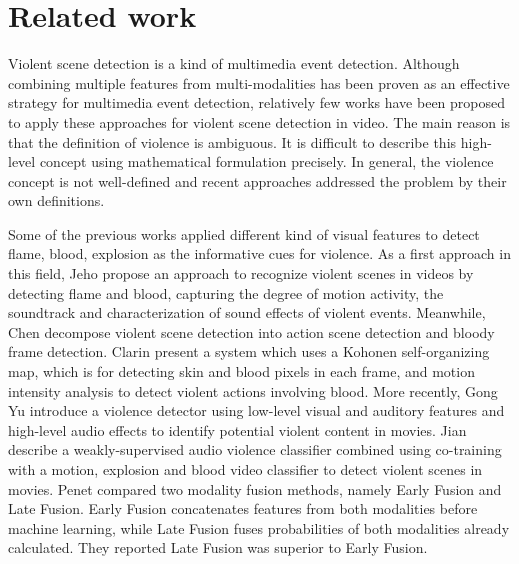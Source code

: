 \documentclass[review]{elsarticle}
\begin{document}
\section{Related work}
Violent scene detection is a kind of multimedia event detection. Although combining multiple features from multi-modalities has been proven as an effective strategy for multimedia event detection, relatively few works have been proposed to apply these approaches for violent scene detection in video. The main reason is that the definition of violence is ambiguous. It is difficult to describe this high-level concept using mathematical formulation precisely. In general, the violence concept is not well-defined and recent approaches addressed the problem by their own definitions.

Some of the previous works applied different kind of visual features to detect flame, blood, explosion as the informative cues for violence. As a first approach in this field, Jeho \cite{nam1998audio} propose an approach to recognize violent scenes in videos by detecting flame and blood, capturing the degree of motion activity, the soundtrack and characterization of sound effects of violent events. Meanwhile, Chen \cite{2} decompose violent scene detection into action scene detection and bloody frame detection. Clarin \cite{3} present a system which uses a Kohonen self-organizing map, which is for detecting skin and blood pixels in each frame, and motion intensity analysis to detect violent actions involving blood. More recently, Gong Yu \cite{11} introduce a violence detector using low-level visual and auditory features and high-level audio effects to identify potential violent content in movies. Jian \cite{17} describe a weakly-supervised audio violence classifier combined using co-training with a motion, explosion and blood video classifier to detect violent scenes in movies. Penet \cite{21} compared two modality fusion methods, namely Early Fusion and Late Fusion. Early Fusion concatenates features from both modalities before machine learning, while Late Fusion fuses probabilities of both modalities already calculated. They reported Late Fusion was superior to Early Fusion.
\end{document}
